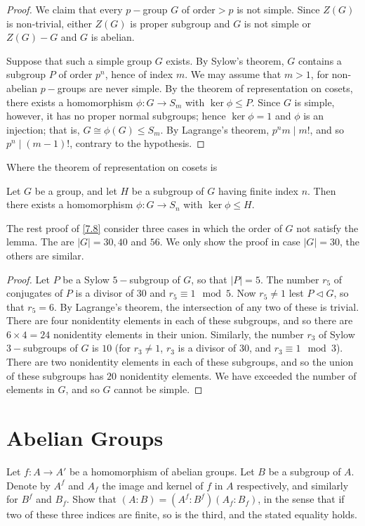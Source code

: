 \begin{proof}
  We claim that every $p-$group $G$ of order$>p$ is not simple. Since $Z(G)$ is non-trivial, either $Z(G)$ is proper subgroup and $G$ is not simple or $Z(G)-G$ and $G$ is abelian.

Suppose that such a simple group $G$ exists. By Sylow's theorem, $G$ contains a subgroup $P$ of order $p^n$, hence of index $m$. We may assume that $m>1$, for non-abelian $p-$groups are
never simple. By the theorem of representation on cosets, there exists a homomorphism $\phi\colon G\to S_m$ with $\ker \phi\leqslant P$. Since $G$ is simple, however, it has no proper normal subgroups; hence $\ker\phi =1$ and $\phi$ is an injection; that is, $G\cong\phi(G)\leqslant S_m$. By Lagrange's theorem, $p^nm\mid m!$, and so $p^n\mid (m-1)!$, contrary to the hypothesis.
\end{proof}
Where the theorem of representation on cosets is
\begin{thm}
  Let $G$ be a group, and let $H$ be a subgroup of $G$ having finite index $n$. Then there exists a homomorphism $\phi\colon G\to S_n$ with $\ker\phi\leqslant H$.
\end{thm}
The rest proof of \ref{7.8} consider three cases in which the order of $G$ not satisfy the lemma. The are $|G|=30, 40$ and $56$. We only show the proof in case $|G|=30$, the others are similar.
\begin{proof}
  Let $P$ be a Sylow $5-$subgroup of $G$, so that $|P|=5$. The number $r_5$ of conjugates of $P$ is a divisor of $30$ and $r_5\equiv1 \mod 5$.
  Now $r_5\neq1$ lest $P\triangleleft G$, so that $r_5=6$. By Lagrange's theorem, the intersection of any two of these is trivial.
  There are four nonidentity elements in each of these subgroups, and so there are $6\times4=24$ nonidentity elements in their union.
  Similarly, the number $r_3$ of Sylow $3-$subgroups of $G$ is $10$ (for $r_3\neq1$, $r_3$ is a divisor of $30$, and $r_3\equiv1 \mod 3$).
  There are two nonidentity elements in each of these subgroups, and so the union of these subgroups has $20$ nonidentity elements.
  We have exceeded the number of elements in $G$, and so $G$ cannot be simple.
\end{proof}
\newpage\section{Abelian Groups}
\begin{ex}
Let $f\colon A\to A'$ be a homomorphism of abelian groups. Let $B$ be a subgroup of $A$. Denote by $A^f$ and $A_f$ the image and kernel of $f$ in $A$ respectively, and similarly for $B^f$ and $B_f$. Show that $(A:B)=(A^f:B^f)(A_f:B_f)$, in the sense that if two of these three indices are finite, so is the third, and the stated equality holds.
\end{ex}

